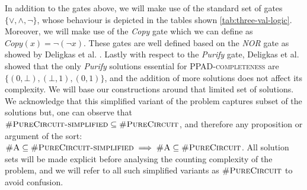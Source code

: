 In addition to the gates above, we will make use of the standard set of gates $\{\vee, \wedge, \neg\}$,
whose behaviour is depicted in the tables shown \ref{tab:three-val-logic}.
Moreover, we will make use of the \textit{Copy} gate which we can define as $\textit{Copy}(x) = \neg (\neg x)$.
These gates are well defined based on the \textit{NOR} gate as showed by Deligkas et al. \cite{deligkas_PureCircuitTightInapproximability_2024}.
Lastly with respect to the \textit{Purify} gate,
Deligkas et al. \cite{deligkas_PureCircuitTightInapproximability_2024} showed that the only \textit{Purify} solutions essential
for \textsc{PPAD-completeness} are $\{(0,\bot), (\bot,1), (0,1)\}$, and the addition of more solutions does not affect its complexity.
We will base our constructions around that limited set of solutions.
We acknowledge that this simplified variant of the problem captures subset of the solutions but,
one can observe that $\textsc{\#PureCircuit-simplified} \subseteq \textsc{\#PureCircuit}$,
and therefore any proposition or argument of the sort:
$\textsc{\#A} \subseteq \textsc{\#PureCircuit-simplified} \implies \textsc{\#A} \subseteq \textsc{\#PureCircuit}$.
All solution sets will be made explicit before analysing the counting complexity of the problem,
and we will refer to all such simplified variants as $\textsc{\#PureCircuit}$ to avoid
confusion. 

\begin{table}[h!]
    \centering
 \quad
{}

    \caption{Three-valued logic \cite{kleene_IntroductionMetamathematics_2009}}\label{tab:three-val-logic}
\end{table}


